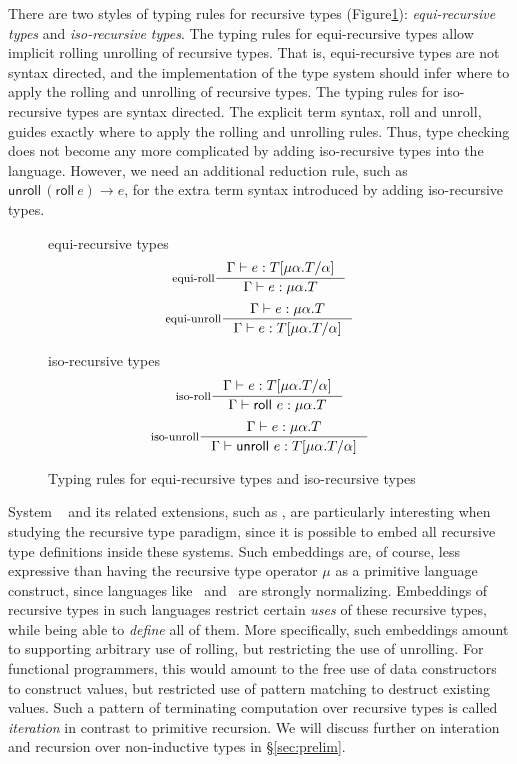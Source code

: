 There are two styles of typing rules for recursive types
(Figure\;\ref{fig:isoVSequi}):
\emph{equi-recursive types} and \emph{iso-recursive types}.
The typing rules for equi-recursive types allow implicit rolling unrolling
of recursive types. That is, equi-recursive types are not syntax directed,
and the implementation of the type system should infer where to apply the
rolling and unrolling of recursive types.
The typing rules for iso-recursive types are syntax directed. The explicit
term syntax, \textsf{roll} and \textsf{unroll}, guides exactly where to apply
the rolling and unrolling rules. Thus, type checking does not become any more
complicated by adding iso-recursive types into the language. However, we need
an additional reduction rule, such as $\mathsf{unroll}\,(\mathsf{roll}~e)\to e$,
for the extra term syntax introduced by adding iso-recursive types.

\begin{figure}\centering
\begin{minipage}{.45\textwidth}\centering
equi-recursive types
\[
\inference[equi-roll]{\Gamma |- e:T[\mu\alpha.T/\alpha]}
                     {\Gamma |- e:\mu\alpha.T} \]
\[
\inference[equi-unroll]{\Gamma |- e:\mu\alpha.T}
                       {\Gamma |- e:T[\mu\alpha.T/\alpha]} \]
\end{minipage}
\begin{minipage}{.45\textwidth}\centering
iso-recursive types
\[
\inference[iso-roll]{\Gamma |- e:T[\mu\alpha.T/\alpha]}
                    {\Gamma |- \mathsf{roll}~e:\mu\alpha.T} \]
\[
\inference[iso-unroll]{\Gamma |- e:\mu\alpha.T}
                      {\Gamma |- \mathsf{unroll}~e:T[\mu\alpha.T/\alpha]} \]
\end{minipage}

\caption{Typing rules for equi-recursive types and iso-recursive types}
\label{fig:isoVSequi}
\end{figure}

System \F\ \cite{Gir71,Rey74} and its related extensions, such as \Fw, %
are particularly interesting when studying the recursive type paradigm, since
it is possible to embed all recursive type definitions inside these systems.
Such embeddings are, of course, less expressive than having the recursive
type operator $\mu$ as a primitive language construct, since languages like
\F\ and \Fw\ are strongly normalizing. Embeddings of recursive types in
such languages restrict certain \emph{uses} of these recursive types,
while being able to \emph{define} all of them. More specifically,
such embeddings amount to supporting arbitrary use of rolling,
but restricting the use of unrolling. For functional programmers,
this would amount to the free use of data constructors to construct values,
but restricted use of pattern matching to destruct existing values.
Such a pattern of terminating computation over recursive types is called
\emph{iteration} in contrast to primitive recursion. We will discuss further
on interation and recursion over non-inductive types in \S\ref{sec:prelim}.

